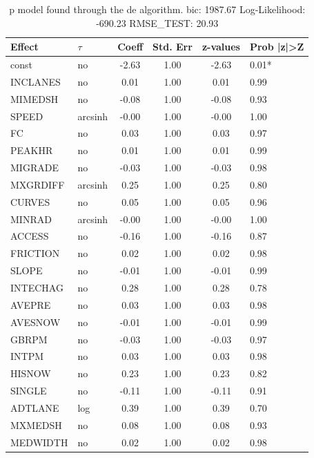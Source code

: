 \begin{table}
	\caption{p model found through the de algorithm. bic: 1987.67 Log-Likelihood: -690.23 RMSE_TEST: 20.93}
	\begin{center}
		\begin{tabular}{|l|l|c|c|c|l|}
			\hline
			Effect & $\tau$ & Coeff & Std. Err & z-values & Prob |z|>Z \\
			\hline
			const & no & -2.63 & 1.00 & -2.63 & 0.01* \\
			\hline
			INCLANES & no & 0.01 & 1.00 & 0.01 & 0.99 \\
			\hline
			MIMEDSH & no & -0.08 & 1.00 & -0.08 & 0.93 \\
			\hline
			SPEED & arcsinh & -0.00 & 1.00 & -0.00 & 1.00 \\
			\hline
			FC & no & 0.03 & 1.00 & 0.03 & 0.97 \\
			\hline
			PEAKHR & no & 0.01 & 1.00 & 0.01 & 0.99 \\
			\hline
			MIGRADE & no & -0.03 & 1.00 & -0.03 & 0.98 \\
			\hline
			MXGRDIFF & arcsinh & 0.25 & 1.00 & 0.25 & 0.80 \\
			\hline
			CURVES & no & 0.05 & 1.00 & 0.05 & 0.96 \\
			\hline
			MINRAD & arcsinh & -0.00 & 1.00 & -0.00 & 1.00 \\
			\hline
			ACCESS & no & -0.16 & 1.00 & -0.16 & 0.87 \\
			\hline
			FRICTION & no & 0.02 & 1.00 & 0.02 & 0.98 \\
			\hline
			SLOPE & no & -0.01 & 1.00 & -0.01 & 0.99 \\
			\hline
			INTECHAG & no & 0.28 & 1.00 & 0.28 & 0.78 \\
			\hline
			AVEPRE & no & 0.03 & 1.00 & 0.03 & 0.98 \\
			\hline
			AVESNOW & no & -0.01 & 1.00 & -0.01 & 0.99 \\
			\hline
			GBRPM & no & -0.03 & 1.00 & -0.03 & 0.97 \\
			\hline
			INTPM & no & 0.03 & 1.00 & 0.03 & 0.98 \\
			\hline
			HISNOW & no & 0.23 & 1.00 & 0.23 & 0.82 \\
			\hline
			SINGLE & no & -0.11 & 1.00 & -0.11 & 0.91 \\
			\hline
			ADTLANE & log & 0.39 & 1.00 & 0.39 & 0.70 \\
			\hline
			MXMEDSH & no & 0.08 & 1.00 & 0.08 & 0.93 \\
			\hline
			MEDWIDTH & no & 0.02 & 1.00 & 0.02 & 0.98 \\

\end{tabular}
\end{center}
\end{table}
